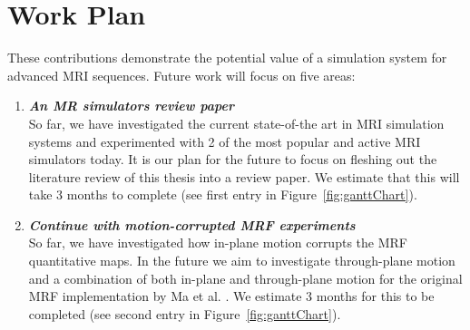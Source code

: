 \section{Work Plan}\label{chapterlabel4sec2}

These contributions demonstrate the potential value of a simulation system for advanced MRI sequences. Future work will focus on five areas:

\begin{enumerate}
    \item \textit{\textbf{An MR simulators review paper}} \\
    So far, we have investigated the current state-of-the art in MRI simulation systems and experimented with 2 of the most popular and active MRI simulators today.
    It is our plan for the future to focus on fleshing out the literature review of this thesis into a review paper.
    We estimate that this will take 3 months to complete (see first entry in Figure~\ref{fig:ganttChart}).
    
	\item \textit{\textbf{Continue with motion-corrupted MRF experiments}} \\
	So far, we have investigated how in-plane motion corrupts the MRF quantitative maps.
	In the future we aim to investigate through-plane motion and a combination of both in-plane and through-plane motion for the original MRF implementation by Ma et al. \cite{Ma2013}.
	We estimate 3 months for this to be completed (see second entry in Figure~\ref{fig:ganttChart}).
	

\end{enumerate}
